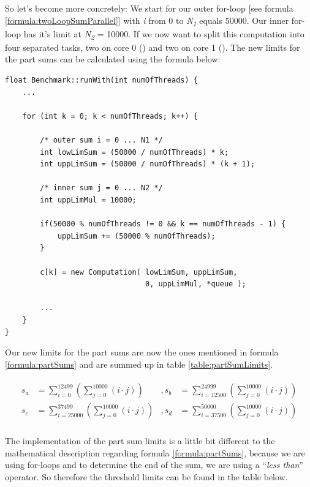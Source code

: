 \noindent So let's become more concretely: We start for our outer for-loop [see formula \ref{formula:twoLoopSumParallel}] with \textit{i} from 0 to \textit{N\textsubscript{1}} equals 50000. Our inner for-loop has it's limit at \textit{N\textsubscript{2}} = 10000. If we now want to split this computation into four separated tasks, two on core 0 () and two on core 1 (). The new limits for the part sums can be calculated using the formula below:

\begin{lstlisting}[label={code:calcLimits}]
float Benchmark::runWith(int numOfThreads) {
	...
	
	for (int k = 0; k < numOfThreads; k++) {
	
		/* outer sum i = 0 ... N1 */
		int lowLimSum = (50000 / numOfThreads) * k;
		int uppLimSum = (50000 / numOfThreads) * (k + 1);
		
		/* inner sum j = 0 ... N2 */
		int uppLimMul = 10000;
	
		if(50000 % numOfThreads != 0 && k == numOfThreads - 1) {
			uppLimSum += (50000 % numOfThreads);
		}
	
		c[k] = new Computation(	lowLimSum, uppLimSum, 
								0, uppLimMul, *queue );
		
		...
	}
}
\end{lstlisting}

Our new limits for the part sums are now the ones mentioned in formula \ref{formula:partSums} and are summed up in table \ref{table:partSumLimits}.

\newpage

\begin{align} \label{formula:partSums}
	\begin{aligned}
		s_a &= \sum_{i = 0}^{12499} \left( \sum_{j = 0}^{10000} \left(i \cdot j\right) \right) &, 
		s_b &= \sum_{i = 12500}^{24999} \left( \sum_{j = 0}^{10000} \left(i \cdot j\right) \right) \\
		s_c &= \sum_{i = 25000}^{37499} \left( \sum_{j = 0}^{10000} \left(i \cdot j\right) \right) &, 
		s_d &= \sum_{i = 37500}^{50000} \left( \sum_{j = 0}^{10000} \left(i \cdot j\right) \right)
	\end{aligned}
\end{align}\\

\noindent The implementation of the part sum limits is a little bit different to the mathematical description regarding formula \ref{formula:partSums}, because we are using for-loops and to determine the end of the sum, we are using a ``\textit{less than}'' operator. So therefore the threshold limits can be found in the table below.

